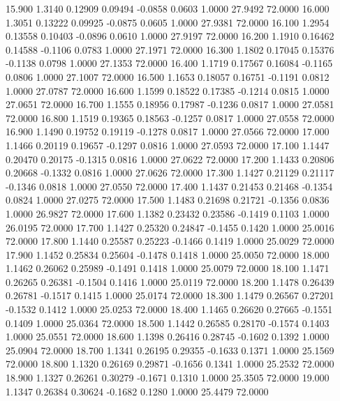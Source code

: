   15.900   1.3140   0.12909   0.09494  -0.0858   0.0603   1.0000  27.9492  72.0000
  16.000   1.3051   0.13222   0.09925  -0.0875   0.0605   1.0000  27.9381  72.0000
  16.100   1.2954   0.13558   0.10403  -0.0896   0.0610   1.0000  27.9197  72.0000
  16.200   1.1910   0.16462   0.14588  -0.1106   0.0783   1.0000  27.1971  72.0000
  16.300   1.1802   0.17045   0.15376  -0.1138   0.0798   1.0000  27.1353  72.0000
  16.400   1.1719   0.17567   0.16084  -0.1165   0.0806   1.0000  27.1007  72.0000
  16.500   1.1653   0.18057   0.16751  -0.1191   0.0812   1.0000  27.0787  72.0000
  16.600   1.1599   0.18522   0.17385  -0.1214   0.0815   1.0000  27.0651  72.0000
  16.700   1.1555   0.18956   0.17987  -0.1236   0.0817   1.0000  27.0581  72.0000
  16.800   1.1519   0.19365   0.18563  -0.1257   0.0817   1.0000  27.0558  72.0000
  16.900   1.1490   0.19752   0.19119  -0.1278   0.0817   1.0000  27.0566  72.0000
  17.000   1.1466   0.20119   0.19657  -0.1297   0.0816   1.0000  27.0593  72.0000
  17.100   1.1447   0.20470   0.20175  -0.1315   0.0816   1.0000  27.0622  72.0000
  17.200   1.1433   0.20806   0.20668  -0.1332   0.0816   1.0000  27.0626  72.0000
  17.300   1.1427   0.21129   0.21117  -0.1346   0.0818   1.0000  27.0550  72.0000
  17.400   1.1437   0.21453   0.21468  -0.1354   0.0824   1.0000  27.0275  72.0000
  17.500   1.1483   0.21698   0.21721  -0.1356   0.0836   1.0000  26.9827  72.0000
  17.600   1.1382   0.23432   0.23586  -0.1419   0.1103   1.0000  26.0195  72.0000
  17.700   1.1427   0.25320   0.24847  -0.1455   0.1420   1.0000  25.0016  72.0000
  17.800   1.1440   0.25587   0.25223  -0.1466   0.1419   1.0000  25.0029  72.0000
  17.900   1.1452   0.25834   0.25604  -0.1478   0.1418   1.0000  25.0050  72.0000
  18.000   1.1462   0.26062   0.25989  -0.1491   0.1418   1.0000  25.0079  72.0000
  18.100   1.1471   0.26265   0.26381  -0.1504   0.1416   1.0000  25.0119  72.0000
  18.200   1.1478   0.26439   0.26781  -0.1517   0.1415   1.0000  25.0174  72.0000
  18.300   1.1479   0.26567   0.27201  -0.1532   0.1412   1.0000  25.0253  72.0000
  18.400   1.1465   0.26620   0.27665  -0.1551   0.1409   1.0000  25.0364  72.0000
  18.500   1.1442   0.26585   0.28170  -0.1574   0.1403   1.0000  25.0551  72.0000
  18.600   1.1398   0.26416   0.28745  -0.1602   0.1392   1.0000  25.0904  72.0000
  18.700   1.1341   0.26195   0.29355  -0.1633   0.1371   1.0000  25.1569  72.0000
  18.800   1.1320   0.26169   0.29871  -0.1656   0.1341   1.0000  25.2532  72.0000
  18.900   1.1327   0.26261   0.30279  -0.1671   0.1310   1.0000  25.3505  72.0000
  19.000   1.1347   0.26384   0.30624  -0.1682   0.1280   1.0000  25.4479  72.0000
